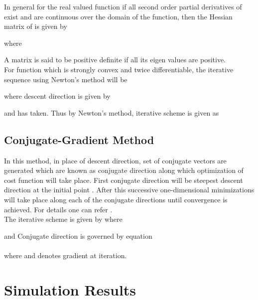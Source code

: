 \documentclass[11pt]{article}
\numberwithin{equation}{section}
\begin{document}
In general for the real valued function  if all second order partial derivatives of  exist and are continuous over the domain of the function, then the Hessian matrix of  is given by

\newline
where \newline

\noindent A matrix is said to be positive definite if all its eigen values are positive.\\
For function   which is strongly convex and twice differentiable,
 the iterative sequence using Newton's method \cite{aw} will be
 

where descent direction  is given by

and  has taken. Thus by Newton's method, iterative scheme is given as




\subsection{Conjugate-Gradient Method}
In this method, in place of descent direction, set of conjugate vectors are generated which are known as conjugate direction along which optimization of cost function will take place. First conjugate direction  will be steepest descent direction at the initial point . After this successive one-dimensional minimizations will take place along each of the conjugate directions  until convergence is achieved. For details one can refer \cite{aw,nw}.\\






The iterative scheme is given by  where

and Conjugate direction is governed by equation\\
\\

where
 and  denotes gradient at  iteration.


\newpage

\section{Simulation Results}
\end{document}
